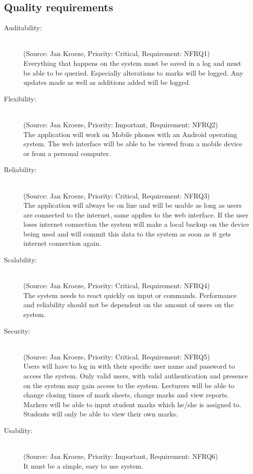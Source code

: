 \documentclass[12pt]{article}
\begin{document}
  \subsection{Quality requirements}
\begin{description}
  \item[Auditability:] \hfill  \\
  (Source: Jan Kroeze, Priority: Critical, Requirement: NFRQ1) \\
  Everything that happens on the system must be saved in a log and must be able to be queried. Especially alterations to marks will be logged. Any updates made as well as additions added will be logged. \\
  \item[Flexibility:] \hfill \\
  (Source: Jan Kroeze, Priority: Important, Requirement: NFRQ2) \\
  The application will work on Mobile phones with an Android operating system. The web interface will be able to be viewed from a mobile device or from a personal computer.\\
  \item[Reliability:] \hfill \\
  (Source: Jan Kroeze, Priority: Critical, Requirement: NFRQ3) \\
  The application will always be on line and will be usable as long as users are connected to the internet, same applies to the web interface. If the user loses internet connection the system will make a local backup on the device being used and will commit this data to the system as soon as it gets internet connection again.\\
  \item[Scalability:] \hfill \\
  (Source: Jan Kroeze, Priority: Critical, Requirement: NFRQ4) \\
  The system needs to react quickly on input or commands. Performance and reliability should not be dependent on the amount of users on the system.\\
  \item[Security:] \hfill \\
  (Source: Jan Kroeze, Priority: Critical, Requirement: NFRQ5) \\
  Users will have to log in with their specific user name and password to access the system. Only valid users, with valid authentication and presence on the system may gain access to the system. Lecturers will be able to change closing times of mark sheets, change marks and view reports. Markers will be able to input student marks which he/she is assigned to. Students will only be able to view their own marks.  \\
  \item[Usability:] \hfill \\
  (Source: Jan Kroeze, Priority: Important, Requirement: NFRQ6) \\
  It must be a simple, easy to use system.
\end{description} 
\end{document}
